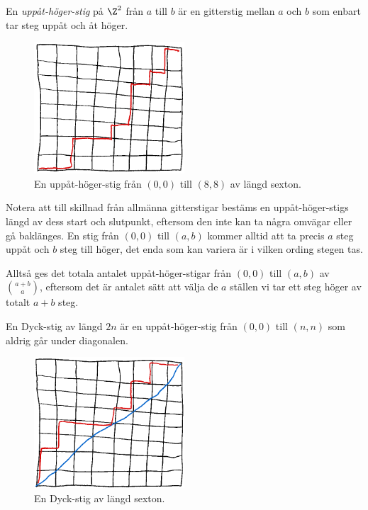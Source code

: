 \documentclass{tufte-handout}
\begin{document}
\begin{definition}
    En \emph{uppåt-höger-stig} på $\Z^2$ från $a$ till $b$ är en gitterstig mellan $a$ och $b$ som enbart tar steg uppåt och åt höger.
    \begin{figure}[h]
        \centering
        \includegraphics[width=0.5\textwidth]{graphics/right_up_lattice_path.png}
        \caption{En uppåt-höger-stig från $(0,0)$ till $(8,8)$ av längd sexton.}
    \end{figure}
\end{definition}

Notera att till skillnad från allmänna gitterstigar bestäms en uppåt-höger-stigs längd av dess start och slutpunkt, eftersom den inte kan ta några omvägar eller gå baklänges. En stig från $(0,0)$ till $(a,b)$ kommer alltid att ta precis $a$ steg uppåt och $b$ steg till höger, det enda som kan variera är i vilken ording stegen tas.

Alltså ges det totala antalet uppåt-höger-stigar från $(0,0)$ till $(a,b)$ av $\binom{a+b}{a}$, eftersom det är antalet sätt att välja de $a$ ställen vi tar ett steg höger av totalt $a+b$ steg.

\begin{definition}
    En Dyck-stig av längd $2n$ är en uppåt-höger-stig från $(0,0)$ till $(n,n)$ som aldrig går under diagonalen.
    \begin{figure}
        \centering
        \includegraphics*[width=0.5\textwidth]{graphics/Dyck_path.png}
        \caption{En Dyck-stig av längd sexton.}
    \end{figure}
\end{definition}
\end{document}
